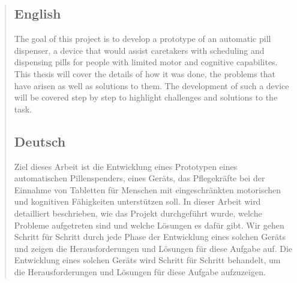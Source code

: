 
\begin{abstract}
	\subsection*{English}
The goal of this project is to develop a prototype of an automatic pill dispenser, a device that would assist caretakers with scheduling and dispensing pills for people with limited motor	and cognitive capabilites. This thesis will cover the details of how it was done, the problems that have arisen as well as solutions to them. The development of such a device will be covered step by step to highlight challenges and solutions to the task.
	\subsection*{Deutsch}
Ziel dieses Arbeit ist die Entwicklung eines Prototypen eines automatischen Pillenspenders, eines Geräts, das Pflegekräfte bei der Einnahme von Tabletten für Menschen mit eingeschränkten motorischen und kognitiven Fähigkeiten unterstützen soll. In dieser Arbeit wird detailliert beschrieben, wie das Projekt durchgeführt wurde, welche Probleme aufgetreten sind und welche Lösungen es dafür gibt. Wir gehen Schritt für Schritt durch jede Phase der Entwicklung eines solchen Geräts und zeigen die Herausforderungen und Lösungen für diese Aufgabe auf. Die Entwicklung eines solchen Geräts wird Schritt für Schritt behandelt, um die Herausforderungen und Lösungen für diese Aufgabe aufzuzeigen.
	
\end{abstract}